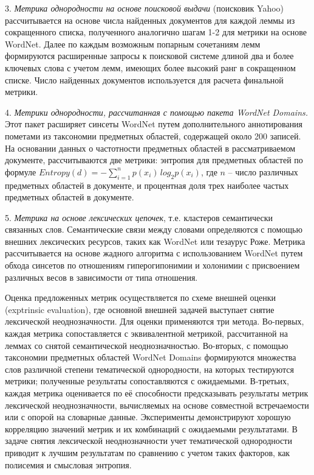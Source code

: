 3. \textit{Метрика однородности на основе поисковой выдачи} (поисковик Yahoo) рассчитывается на основе числа найденных документов для каждой леммы из сокращенного списка, полученного аналогично шагам 1-2 для метрики на основе WordNet. Далее по каждым возможным попарным сочетаниям лемм формируются расширенные запросы к поисковой системе длиной два и более ключевых слова с учетом лемм, имеющих более высокий ранг в сокращенном списке. Число найденных документов используется для расчета финальной метрики.

4. \textit{Метрики однородности, рассчитанная с помощью пакета WordNet Domains.} Этот пакет расширяет синсеты WordNet путем дополнительного аннотирования пометами из таксономии предметных областей, содержащей около 200 записей. На основании данных о частотности предметных областей в рассматриваемом документе, рассчитываются две метрики: энтропия для предметных областей по формуле $Entropy(d) = -\sum_{i = 1}^{n}p(x_i)\,log_2 p(x_i)$, где $n$ -- число различных предметных областей в документе, и процентная доля трех наиболее частых предметных областей в документе.

5. \textit{Метрика на основе лексических цепочек}, т.е. кластеров семантически связанных слов. Семантические связи между словами определяются с помощью внешних лексических ресурсов, таких как WordNet или тезаурус Роже. Метрика рассчитывается на основе жадного алгоритма с использованием WordNet путем обхода синсетов по отношениям гиперогипонимии и холонимии с присвоением различных весов в зависимости от типа отношения.

Оценка предложенных метрик осуществляется по схеме внешней оценки (exptrinsic evaluation), где основной внешней задачей выступает снятие лексической неоднозначности. Для оценки применяются три метода. Во-первых, каждая метрика сопоставляется с эквивалентной метрикой, рассчитанной на леммах со снятой семантической неоднозначностью. Во-вторых, с помощью таксономии предметных областей WordNet Domains формируются множества слов различной степени тематической однородности, на которых тестируются метрики; полученные результаты сопоставляются с ожидаемыми. В-третьих, каждая метрика оценивается по её способности предсказывать результаты метрик лексической неоднозначности, вычисляемых на основе совместной встречаемости или с опорой на словарные данные. Эксперименты демонстрируют хорошую корреляцию значений метрик и их комбинаций с ожидаемыми результатами. В задаче снятия лексической неоднозначности учет тематической однородности приводит к лучшим результатам по сравнению с учетом таких факторов, как полисемия и смысловая энтропия.



